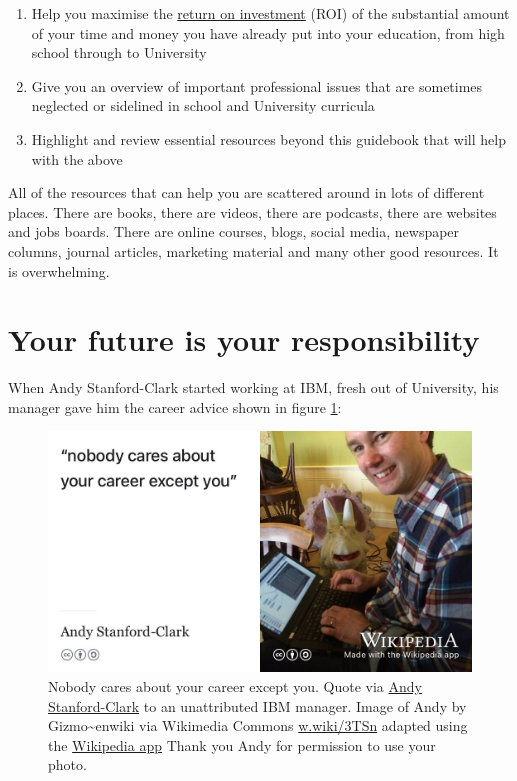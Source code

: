 \documentclass[
]{book}
\providecommand{\tightlist}{%
  \setlength{\itemsep}{0pt}\setlength{\parskip}{0pt}}
\begin{document}
\begin{enumerate}
\def\labelenumi{\arabic{enumi}.}
\tightlist
\item
  Help you maximise the \href{https://en.wikipedia.org/wiki/Return_on_investment}{return on investment} (ROI) of the substantial amount of your time and money you have already put into your education, from high school through to University
\item
  Give you an overview of important professional issues that are sometimes neglected or sidelined in school and University curricula
\item
  Highlight and review essential resources beyond this guidebook that will help with the above
\end{enumerate}

All of the resources that can help you are scattered around in lots of different places. There are books, there are videos, there are podcasts, there are websites and jobs boards. There are online courses, blogs, social media, newspaper columns, journal articles, marketing material and many other good resources. It is overwhelming.

\hypertarget{responsibility}{%
\section{Your future is your responsibility}\label{responsibility}}

When Andy Stanford-Clark started working at IBM, fresh out of University, his manager gave him the career advice shown in figure \ref{fig:andysc-fig}:

\begin{figure}

{\centering \includegraphics[width=0.99\linewidth]{images/nobody-cares-about-your-career-except-you} 

}

\caption{Nobody cares about your career except you. Quote via \href{https://en.wikipedia.org/wiki/Andy_Stanford-Clark}{Andy Stanford-Clark} \citep{andystanfordclark} to an unattributed IBM manager. Image of Andy by Gizmo\textasciitilde enwiki via Wikimedia Commons \href{https://w.wiki/3TSn}{w.wiki/3TSn} adapted using the \href{https://apps.apple.com/us/app/wikipedia/id324715238}{Wikipedia app} Thank you Andy for permission to use your photo.}\label{fig:andysc-fig}
\end{figure}
\end{document}
